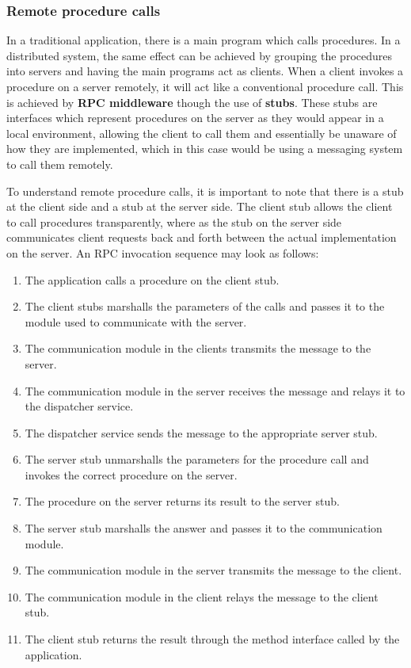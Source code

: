 \documentclass[a4paper]{article}
\begin{document}
\subsubsection{Remote procedure calls}

In a traditional application, there is a main program which calls procedures. In a distributed system, the same effect can be achieved by grouping the procedures into servers and having the main programs act as clients. When a client invokes a procedure on a server remotely, it will act like a conventional procedure call. This is achieved by \textbf{RPC middleware} though the use of \textbf{stubs}. These stubs are interfaces which represent procedures on the server as they would appear in a local environment, allowing the client to call them and essentially be unaware of how they are implemented, which in this case would be using a messaging system to call them remotely.

To understand remote procedure calls, it is important to note that there is a stub at the client side and a stub at the server side. The client stub allows the client to call procedures transparently, where as the stub on the server side communicates client requests back and forth between the actual implementation on the server. An RPC invocation sequence may look as follows:

\begin{enumerate}
\item The application calls a procedure on the client stub.
\item The client stubs marshalls the parameters of the calls and passes it to the module used to communicate with the server.
\item The communication module in the clients transmits the message to the server.
\item The communication module in the server receives the message and relays it to the dispatcher service.
\item The dispatcher service sends the message to the appropriate server stub.
\item The server stub unmarshalls the parameters for the procedure call and invokes the correct procedure on the server.
\item The procedure on the server returns its result to the server stub.
\item The server stub marshalls the answer and passes it to the communication module.
\item The communication module in the server transmits the message to the client.
\item The communication module in the client relays the message to the client stub.
\item The client stub returns the result through the method interface called by the application.
\end{enumerate}
\end{document}
